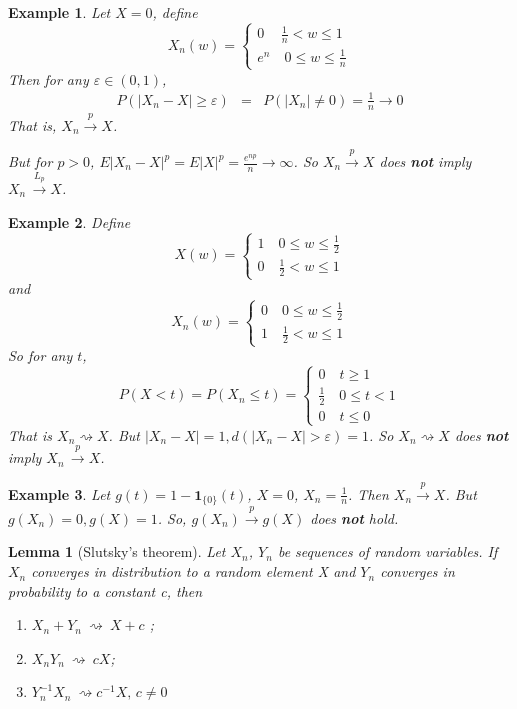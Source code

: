 \documentclass[11pt]{article}
\newtheorem{lemma}{Lemma}[section]
\newtheorem{example}{Example}[section]
\begin{document}
\begin{example}
Let $X=0$, define
$$
X_n(w) = \left\lbrace
\begin{array}{l}
0 \,\quad \frac{1}{n}< w\leq 1\\
e^n \quad 0\leq w\leq \frac{1}{n}
\end{array}
\right.
$$
Then for any $\varepsilon\in(0,1)$,
\begin{eqnarray*}
P(|X_n-X|\geq\varepsilon)&=& P(|X_n|\neq 0)=\frac{1}{n}\rightarrow 0
\end{eqnarray*}
That is, $X_n \xrightarrow{p} X$.

But for $p>0$, $E|X_n-X|^p=E|X|^p=\frac{e^{np}}{n} \rightarrow \infty$. So $X_n \xrightarrow{p} X$ does \textbf{not} imply $X_n \, \xrightarrow{L_p} X$.
\end{example}
\begin{example}
Define
$$
X(w) = \left\lbrace
\begin{array}{l}
1 \quad 0\leq w\leq \frac{1}{2}\\
0 \quad \frac{1}{2}< w\leq 1
\end{array}
\right.
$$
and 
$$
X_n(w) = \left\lbrace
\begin{array}{l}
0 \quad 0\leq w\leq \frac{1}{2}\\
1 \quad \frac{1}{2}< w\leq 1
\end{array}
\right.
$$
So for any $t$, 
$$
P(X<t)=P(X_n\leq t)= \left\lbrace
\begin{array}{l}
0 \quad t\geq 1\\
\frac{1}{2} \quad 0\leq t < 1 \\
0 \quad t\leq 0
\end{array}
\right.
$$
That is $X_n \rightsquigarrow X$. But $|X_n-X| = 1, d(|X_n-X|>\varepsilon) = 1$. So  $X_n \rightsquigarrow X$ does \textbf{not} imply $X_n \, \xrightarrow{p} X$.
\end{example}
\begin{example}
Let $g(t) = 1-\bm{1}_{\{0\}}(t)$, $X=0$, $X_n=\frac{1}{n}$. Then $X_n \xrightarrow{p} X$. But $g(X_n)=0, g(X)=1$. So, $g(X_n) \xrightarrow{p} g(X)$ does \textbf{not} hold.
\end{example}
\begin{lemma}[Slutsky's theorem]
Let ${X_n}$, ${Y_n}$ be sequences of random variables. If $X_n$ converges in distribution to a random element X and $Y_n$ converges in probability to a constant c, then
\begin{enumerate}
\item $X_n + Y_n \ \rightsquigarrow\ X + c$ ;
\item $X_nY_n \ \rightsquigarrow\ cX $;
\item $Y_n^{-1}X_n \ \rightsquigarrow c^{-1}X, \, c\neq 0$
\end{enumerate}
\end{lemma}
\end{document}
